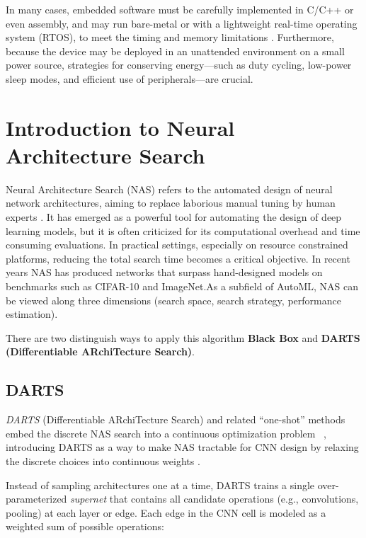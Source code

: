 In many cases, embedded software must be carefully implemented in C/C++ or even assembly, and may run bare-metal or with a lightweight real-time operating system (RTOS), to meet the timing and memory limitations \cite{techtarget_embedded_system}. Furthermore, because the device may be deployed in an unattended environment on a small power source, strategies for conserving energy---such as duty cycling, low-power sleep modes, and efficient use of peripherals---are crucial.

\clearpage


\section{Introduction to Neural Architecture Search}
\label{chap:nas}
Neural Architecture Search (NAS) refers to the automated design of neural network architectures, aiming to replace laborious manual tuning by human experts \cite{elsken2019neural}. It has emerged as a
powerful tool for automating the design of deep learning models, but it is often criticized for its computational overhead and time consuming evaluations. In practical settings, especially on resource constrained platforms, reducing the total search time becomes a critical objective. In recent years NAS has produced networks that surpass hand-designed models on benchmarks such as CIFAR-10 and ImageNet.As a subfield of AutoML, NAS can be viewed along three dimensions (search space, search strategy, performance estimation)\cite{elsken2019neural}.

There are two distinguish ways to apply this algorithm \textbf{Black Box} and \textbf{DARTS (Differentiable ARchiTecture Search)}.

\subsection{DARTS}
 \textit{DARTS} (Differentiable ARchiTecture Search) and related ``one-shot'' methods embed the discrete NAS search into a continuous optimization problem ~\cite{liu2018darts}, introducing DARTS as a way to make NAS tractable for CNN design by relaxing the discrete choices into continuous weights \cite{elsken2019neural}.

Instead of sampling architectures one at a time, DARTS trains a single over-parameterized \textit{supernet} \cite{SuperNet} that contains all candidate operations (e.g., convolutions, pooling) at each layer or edge. Each edge in the CNN cell is modeled as a weighted sum of possible operations:

